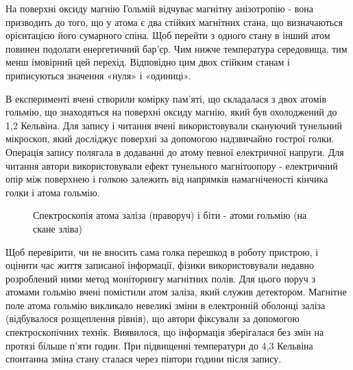 \documentclass[a4paper,14pt]{extreport}
\begin{document}
На поверхні оксиду магнію Гольмій відчуває магнітну анізотропію - вона призводить до того, що у атома є два стійких магнітних стана, що визначаються орієнтацією його сумарного спіна. Щоб перейти з одного стану в інший атом повинен подолати енергетичний бар'єр. Чим нижче температура середовища, тим менш імовірний цей перехід. Відповідно цим двох стійким станам і приписуються значення «нуля» і «одиниці».\par

В експерименті вчені створили комірку пам'яті, що складалася з двох атомів гольмію, що знаходяться на поверхні оксиду магнію, який був охолоджений до 1,2 Кельвіна. Для запису і читання вчені використовували скануючий тунельний мікроскоп, який досліджує поверхні за допомогою надзвичайно гострої голки. Операція запису полягала в додаванні до атому певної електричної напруги. Для читання автори використовували ефект тунельного магнітоопору - електричний опір між поверхнею і голкою залежить від напрямків намагніченості кінчика голки і атома гольмію. \par


\begin{figure}[h]
  \caption{Спектроскопія атома заліза (праворуч) і біти - атоми гольмію (на скане зліва)}
  \label{ris7}
\end{figure}


Щоб перевірити, чи не вносить сама голка перешкод в роботу пристрою, і оцінити час життя записаної інформації, фізики використовували недавно розроблений ними метод моніторингу магнітних полів. Для цього поруч з атомами гольмію вчені помістили атом заліза, який служив детектором. Магнітне поле атома гольмію викликало невеликі зміни в електронній оболонці заліза (відбувалося розщеплення рівнів), що автори фіксували за допомогою спектроскопічних технік. Виявилося, що інформація зберігалася без змін на протязі більше п'яти годин. При підвищенні температури до 4,3 Кельвіна спонтанна зміна стану сталася через півтори години після запису.\par
\end{document}
